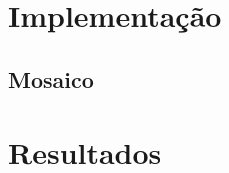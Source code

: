 \documentclass[assignment = 0]{homework}
\begin{document}
    \section{Implementação}

    \subsection{Mosaico} \label{sec:mosaico}

    \section{Resultados}
\end{document}

